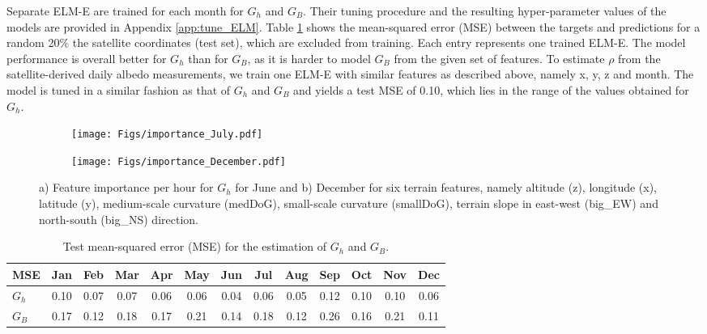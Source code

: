 Separate ELM-E are trained for each month for $G_h$ and $G_B$. Their tuning procedure and the resulting hyper-parameter values of the models are provided in Appendix \ref{app:tune_ELM}. 
Table \ref{tab:G_train} shows the mean-squared error (MSE) between the targets and predictions for a random 20\% the satellite coordinates (test set), which are excluded from training. Each entry represents one trained ELM-E.
The model performance is overall better for $G_h$ than for $G_B$, as it is harder to model $G_B$ from the given set of features.
%
To estimate $\rho$ from the satellite-derived daily albedo measurements, we train one ELM-E with similar features as described above, namely x, y, z and month. The model is tuned in a similar fashion as that of $G_h$ and $G_B$ and yields a test MSE of 0.10, which lies in the range of the values obtained for $G_h$.

\begin{figure}[tb]
\centering
\begin{subfigure}{.4\textwidth}
  \centering
  \texttt{[image: Figs/importance\_July.pdf]}  
\end{subfigure}
\begin{subfigure}{.4\textwidth}
  \centering
  \texttt{[image: Figs/importance\_December.pdf]}  
\end{subfigure}
\caption{a) Feature importance per hour for $G_h$ for June and b) December for six terrain features, namely altitude (z), longitude (x), latitude (y), medium-scale curvature (medDoG), small-scale curvature (smallDoG), terrain slope in east-west (big\_EW) and north-south (big\_NS) direction.}
\label{fig:ftrs_phys}
\end{figure}

\begin{table}[tb]
\centering
\footnotesize
\caption{Test mean-squared error (MSE) for the estimation of $G_h$ and $G_B$.}
\label{tab:G_train}
\begin{tabular}{lcccccccccccc}
\hline 
 \textbf{MSE}   & Jan  & Feb  & Mar   & Apr   & May   & Jun   & Jul   & Aug   & Sep   & Oct  & Nov  & Dec  \\
\hline 
$G_h$  & 0.10 & 0.07 & 0.07  & 0.06  & 0.06  & 0.04  & 0.06  & 0.05  & 0.12  & 0.10 & 0.10 & 0.06 \\
$G_B$  & 0.17 & 0.12 & 0.18 & 0.17 & 0.21 & 0.14  & 0.18  & 0.12 & 0.26 & 0.16 & 0.21 & 0.11 \\
\hline 
\end{tabular}
\end{table}

